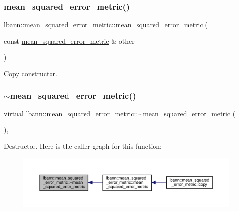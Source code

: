 \subsubsection{\texorpdfstring{mean\+\_\+squared\+\_\+error\+\_\+metric()}{mean\_squared\_error\_metric()}\hspace{0.1cm}{\footnotesize\ttfamily [2/2]}}
{\footnotesize\ttfamily lbann\+::mean\+\_\+squared\+\_\+error\+\_\+metric\+::mean\+\_\+squared\+\_\+error\+\_\+metric (\begin{DoxyParamCaption}\item[{const \hyperlink{classlbann_1_1mean__squared__error__metric}{mean\+\_\+squared\+\_\+error\+\_\+metric} \&}]{other }\end{DoxyParamCaption})\hspace{0.3cm}{\ttfamily [default]}}

Copy constructor. \mbox{\label{classlbann_1_1mean__squared__error__metric_a85c8dd7d1bf0b34160ca529c507ebca3}} 
\subsubsection{\texorpdfstring{$\sim$mean\+\_\+squared\+\_\+error\+\_\+metric()}{~mean\_squared\_error\_metric()}}
{\footnotesize\ttfamily virtual lbann\+::mean\+\_\+squared\+\_\+error\+\_\+metric\+::$\sim$mean\+\_\+squared\+\_\+error\+\_\+metric (\begin{DoxyParamCaption}{ }\end{DoxyParamCaption})\hspace{0.3cm}{\ttfamily [virtual]}, {\ttfamily [default]}}

Destructor. Here is the caller graph for this function\+:\nopagebreak
\begin{figure}[H]
\begin{center}
\leavevmode
\includegraphics[width=350pt]{classlbann_1_1mean__squared__error__metric_a85c8dd7d1bf0b34160ca529c507ebca3_icgraph}
\end{center}
\end{figure}


